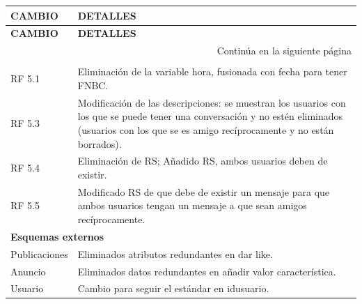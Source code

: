 \begin{longtable}{|p{3cm}|p{11cm}|}
      \hline
      \textbf{CAMBIO} & \textbf{DETALLES} \\
      \hline
      \endfirsthead
      
      \hline
      \textbf{CAMBIO} & \textbf{DETALLES} \\
      \hline
      \endhead
      
      \hline 
      \multicolumn{2}{r}{Continúa en la siguiente página}\\
      \hline 
      \endfoot
      
      \endlastfoot
      
      \multicolumn{2}{|l|}{\textbf{Subsistema de Mensajería}} \\
      \hline
      
      RF 5.1 & Eliminación de la variable hora, fusionada con fecha para tener FNBC. \\
      \hline
      
      RF 5.3 & Modificación de las descripciones: se muestran los usuarios con los que se puede tener una conversación y no estén eliminados (usuarios con los que se es amigo recíprocamente y no están borrados). \\
      \hline
      
      RF 5.4 & Eliminación de RS; Añadido RS, ambos usuarios deben de existir. \\
      \hline
      
      RF 5.5 & Modificado RS de que debe de existir un mensaje para que ambos usuarios tengan un mensaje a que sean amigos recíprocamente. \\
      \hline
      
      \multicolumn{2}{|l|}{\textbf{Esquemas externos}} \\
      \hline
      
      Publicaciones & Eliminados atributos redundantes en dar like. \\
      \hline
      
      Anuncio & Eliminados datos redundantes en añadir valor característica. \\
      \hline
      
      Usuario & Cambio para seguir el estándar en idusuario. \\
      \hline
      
      \end{longtable}